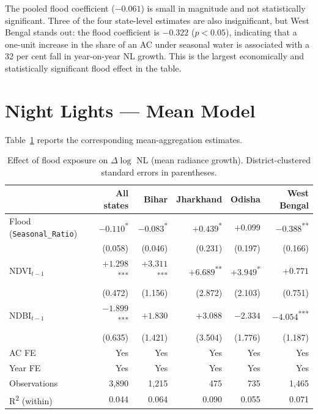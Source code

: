 \documentclass[12pt,a4paper,oneside]{report}
\begin{document}
The pooled flood coefficient ($-0.061$) is small in magnitude and not statistically significant. Three of the four state-level estimates are also insignificant, but West Bengal stands out: the flood coefficient is $-0.322$ ($p<0.05$), indicating that a one-unit increase in the share of an AC under seasonal water is associated with a 32 per cent fall in year-on-year NL growth. This is the largest economically and statistically significant flood effect in the table.

\section{Night Lights --- Mean Model}
Table~\ref{tab:nl-mean} reports the corresponding mean-aggregation estimates.

\begin{table}[h]
\centering
\caption{Effect of flood exposure on $\Delta \log$ NL (mean radiance growth). District-clustered standard errors in parentheses.}
\label{tab:nl-mean}
\begin{tabular}{lrrrrr}
\toprule
 & \textbf{All states} & \textbf{Bihar} & \textbf{Jharkhand} & \textbf{Odisha} & \textbf{West Bengal} \\
\midrule
Flood (\texttt{Seasonal\_Ratio}) & $-0.110$\textsuperscript{*} & $-0.083$\textsuperscript{*} & $+0.439$\textsuperscript{*} & $+0.099$ & $-0.388$\textsuperscript{**} \\
                                  & (0.058)        & (0.046) & (0.231) & (0.197) & (0.166) \\
NDVI$_{t-1}$                      & $+1.298$\textsuperscript{***} & $+3.311$\textsuperscript{***} & $+6.689$\textsuperscript{**} & $+3.949$\textsuperscript{*} & $+0.771$ \\
                                  & (0.472)        & (1.156) & (2.872) & (2.103) & (0.751) \\
NDBI$_{t-1}$                      & $-1.899$\textsuperscript{***} & $+1.830$ & $+3.088$ & $-2.334$ & $-4.054$\textsuperscript{***} \\
                                  & (0.635)        & (1.421) & (3.504) & (1.776) & (1.187) \\
\midrule
AC FE      & Yes & Yes & Yes & Yes & Yes \\
Year FE    & Yes & Yes & Yes & Yes & Yes \\
Observations & 3{,}890 & 1{,}215 & 475 & 735 & 1{,}465 \\
R\textsuperscript{2} (within) & 0.044 & 0.064 & 0.090 & 0.055 & 0.071 \\
\bottomrule
\end{tabular}
\end{table}
\end{document}
